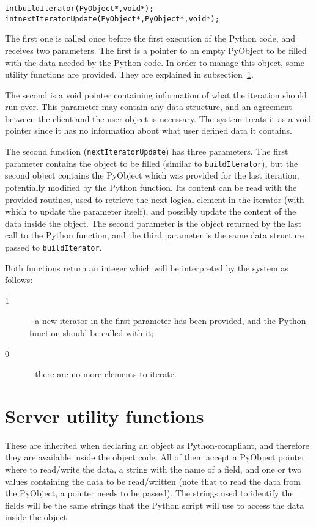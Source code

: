 \begin{alltt}
int buildIterator(PyObject*, void*);
int nextIteratorUpdate(PyObject*, PyObject*, void*);
\end{alltt}

The first one is called once before the first execution of the Python code, and
receives two parameters. The first is a pointer to an empty PyObject to be filled with
the data needed by the Python code. In order to manage this object, some utility
functions are provided. They are explained in subsection~\ref{pythonUtilityFuncs}.

The second is a void pointer containing information of what the iteration should
run over. This parameter may contain any data structure, and an agreement between the
client and the user object is necessary. The system treats it as a void pointer
since it has no information about what user defined data it contains.

The second function (\texttt{nextIteratorUpdate}) has three
parameters. The first parameter contains the object to be filled
(similar to \texttt{buildIterator}), but the second object contains
the PyObject which was provided for the last iteration, potentially
modified by the Python function. Its content can be read with the
provided routines, used to retrieve the next logical element in the
iterator (with which to update the parameter itself), and possibly
update the content of the data inside the \charmpp{} object. The
second parameter is the object returned by the last call to the Python
function, and the third parameter is the same data structure passed
to \texttt{buildIterator}.

Both functions return an integer which will be interpreted by the system as follows:
\begin{description}
\item[1] - a new iterator in the first parameter has been provided, and the Python function should be called with it;
\item[0] - there are no more elements to iterate.
\end{description}

\section{Server utility functions}
\label{pythonUtilityFuncs}

These are inherited when declaring an object as Python-compliant, and therefore
they are available inside the object code. All of them accept a PyObject pointer
where to read/write the data, a string with the name of a field, and one or two
values containing the data to be read/written (note that to read the data from
the PyObject, a pointer needs to be passed). The strings used to identify the
fields will be the same strings that the Python script will use to access the
data inside the object.


